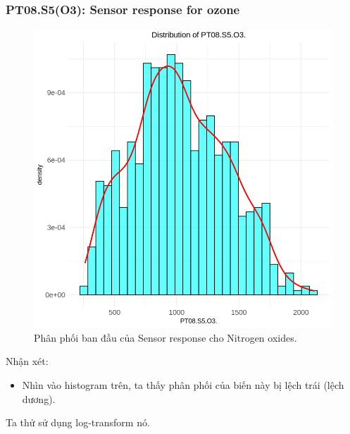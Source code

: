 \subsubsection{PT08.S5(O3): Sensor response for ozone}

\begin{figure}[H]
    \centering
    \includegraphics[width=0.75\columnwidth]{air_figures/PT08.S5(O3)_original_distribution.png}
    \caption{Phân phối ban đầu của Sensor response cho Nitrogen oxides.}
    \label{fig:pto3_original_distribution}
\end{figure}

Nhận xét:
\begin{itemize}
    \item Nhìn vào histogram trên, ta thấy phân phối của biến này bị lệch trái (lệch dương).
\end{itemize}

Ta thử sử dụng log-transform nó.

